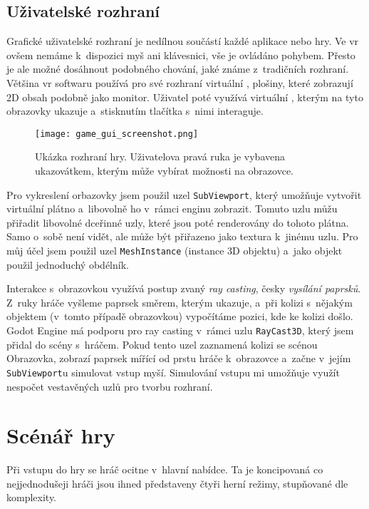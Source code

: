 \label{uzivatelske_rozhrani}
\section{Uživatelské rozhraní}

Grafické uživatelské rozhraní je nedílnou součástí každé aplikace nebo hry. Ve \gls{vr} ovšem nemáme k~dispozici myš ani klávesnici, vše je ovládáno pohybem. Přesto je ale možné dosáhnout podobného chování, jaké známe z~tradičních rozhraní. Většina \gls{vr} softwaru používá pro své rozhraní virtuální , plošiny, které zobrazují 2D obsah podobně jako monitor. Uživatel poté využívá virtuální , kterým na tyto obrazovky ukazuje a~stisknutím tlačítka s~nimi interaguje.

\begin{figure}[H]
  \centering
  \texttt{[image: game\_gui\_screenshot.png]}
  \caption{Ukázka rozhraní hry. Uživatelova pravá ruka je vybavena ukazovátkem, kterým může vybírat možnosti na obrazovce.}
  \label{game_gui_screenshot}
\end{figure}

Pro vykreslení orbazovky jsem použil uzel \texttt{SubViewport}, který umožňuje vytvořit virtuální plátno a~libovolně ho v~rámci enginu zobrazit. Tomuto uzlu můžu přiřadit libovolné dceřinné uzly, které jsou poté renderovány do tohoto plátna. Samo o~sobě není vidět, ale může být přiřazeno jako textura k~jinému uzlu. Pro můj účel jsem použil uzel \texttt{MeshInstance} (instance 3D objektu) a~jako objekt použil jednoduchý obdélník.

Interakce s~obrazovkou využívá postup zvaný \textit{ray casting}, česky \textit{vysílání paprsků}. Z~ruky hráče vyšleme paprsek směrem, kterým ukazuje, a~při kolizi s~nějakým objektem (v~tomto případě obrazovkou) vypočítáme pozici, kde ke kolizi došlo. Godot Engine má podporu pro ray casting v~rámci uzlu \texttt{RayCast3D}, který jsem přidal do scény s~hráčem. Pokud tento uzel zaznamená kolizi se scénou Obrazovka, zobrazí paprsek mířící od prstu hráče k~obrazovce a~začne v~jejím \texttt{SubViewport}u simulovat vstup myší. Simulování vstupu mi umožňuje využít nespočet vestavěných uzlů pro tvorbu rozhraní.

\chapter{Scénář hry}

Při vstupu do hry se hráč ocitne v~hlavní nabídce. Ta je koncipovaná co nejjednodušeji \poml hráči jsou ihned představeny čtyři herní režimy, stupňované dle komplexity.

